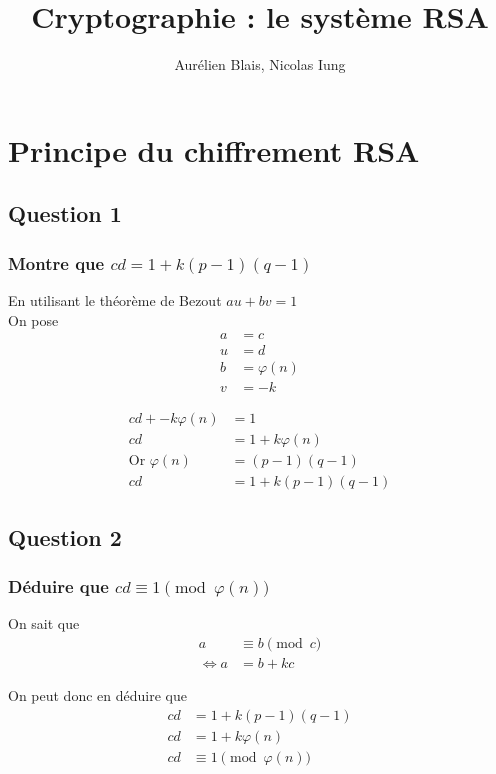 \documentclass[a4paper,10pt]{article}
\title{Cryptographie : le système RSA}
\author{Aurélien Blais, Nicolas Iung}
\begin{document}
\maketitle
\clearpage

\section{Principe du chiffrement RSA}
\subsection{Question 1}
\subsubsection{Montre que $cd = 1 + k(p-1)(q-1)$}

En utilisant le théorème de Bezout $au+bv=1$\\
On pose
\begin{align*}
a &= c\\
u &= d\\
b &= \varphi(n)\\
v &= -k
\end{align*}

\begin{align*}
cd + -k\varphi(n) &= 1\\
cd &= 1 + k\varphi(n)\\
\text{Or } \varphi(n) &= (p-1)(q-1)\\
cd &= 1 + k(p-1)(q-1)
\end{align*}

\subsection{Question 2}
\subsubsection{Déduire que $cd \equiv 1 \pmod{\varphi(n)}$}

On sait que
\begin{align*}
a &\equiv b \pmod c\\
\iff a &= b + kc
\end{align*}

On peut donc en déduire que
\begin{align*}
cd &= 1 + k(p-1)(q-1)\\
cd &= 1 + k\varphi(n)\\
cd &\equiv 1 \pmod{\varphi(n)}
\end{align*}
\end{document}
